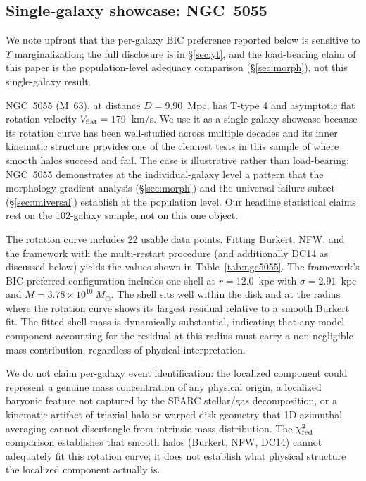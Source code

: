 \documentclass[linenumbers]{aastex701}
\newcommand{\Yt}{\Upsilon}
\newcommand{\Vflat}{V_{\rm flat}}
\newcommand{\Msun}{M_\odot}
\newcommand{\chired}{\chi^2_{\rm red}}
\begin{document}
\subsection{Single-galaxy showcase: NGC~5055}\label{sec:ngc5055}

We note upfront that the per-galaxy BIC preference reported below is sensitive to $\Yt$ marginalization; the full disclosure is in \S\ref{sec:yt}, and the load-bearing claim of this paper is the population-level adequacy comparison (\S\ref{sec:morph}), not this single-galaxy result.

NGC~5055 (M~63), at distance $D = 9.90$~Mpc, has T-type 4 and asymptotic flat rotation velocity $\Vflat = 179$~km/s. We use it as a single-galaxy showcase because its rotation curve has been well-studied across multiple decades and its inner kinematic structure provides one of the cleanest tests in this sample of where smooth halos succeed and fail. The case is illustrative rather than load-bearing: NGC~5055 demonstrates at the individual-galaxy level a pattern that the morphology-gradient analysis (\S\ref{sec:morph}) and the universal-failure subset (\S\ref{sec:universal}) establish at the population level. Our headline statistical claims rest on the 102-galaxy sample, not on this one object.

The rotation curve includes 22 usable data points. Fitting Burkert, NFW, and the framework with the multi-restart procedure (and additionally DC14 as discussed below) yields the values shown in Table~\ref{tab:ngc5055}. The framework's BIC-preferred configuration includes one shell at $r = 12.0$~kpc with $\sigma = 2.91$~kpc and $M = 3.78 \times 10^{10}~\Msun$. The shell sits well within the disk and at the radius where the rotation curve shows its largest residual relative to a smooth Burkert fit. The fitted shell mass is dynamically substantial, indicating that any model component accounting for the residual at this radius must carry a non-negligible mass contribution, regardless of physical interpretation.

We do not claim per-galaxy event identification: the localized component could represent a genuine mass concentration of any physical origin, a localized baryonic feature not captured by the SPARC stellar/gas decomposition, or a kinematic artifact of triaxial halo or warped-disk geometry that 1D azimuthal averaging cannot disentangle from intrinsic mass distribution. The $\chired$ comparison establishes that smooth halos (Burkert, NFW, DC14) cannot adequately fit this rotation curve; it does not establish what physical structure the localized component actually is.
\end{document}
